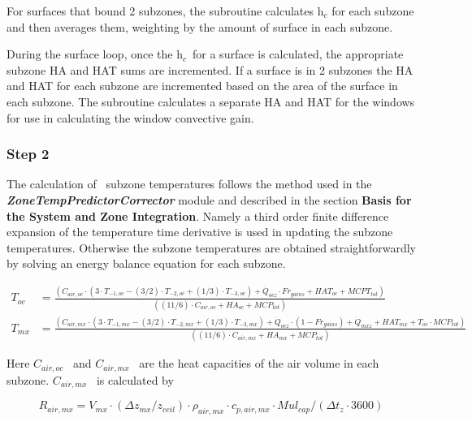 For surfaces that bound 2 subzones, the subroutine calculates h\(_{c}\) for each subzone and then averages them, weighting by the amount of surface in each subzone.

During the surface loop, once the h\(_{c}\)~for a surface is calculated, the appropriate subzone HA and HAT sums are incremented. If a surface is in 2 subzones the HA and HAT for each subzone are incremented based on the area of the surface in each subzone. The subroutine calculates a separate HA and HAT for the windows for use in calculating the window convective gain.

\subsubsection{Step 2}\label{step-2-1}

The calculation of~ subzone temperatures follows the method used in the \textbf{\emph{ZoneTempPredictorCorrector}} module and described in the section \textbf{Basis for the System and Zone Integration}. Namely a third order finite difference expansion of the temperature time derivative is used in updating the subzone temperatures. Otherwise the subzone temperatures are obtained straightforwardly by solving an energy balance equation for each subzone.

\begin{equation}
  \begin{array}{cl}
    T_{oc} & = \frac{(C_{air,oc} \cdot (3 \cdot T_{ - 1,oc} - (3/2) \cdot T_{ - 2,oc} + (1/3) \cdot T_{ - 3,oc}) + \dot Q_{ocz} \cdot Fr_{gains} + HAT_{oc} + MCPT_{tot})} {((11/6) \cdot C_{air,oc} + HA_{oc} + MCP_{tot})} \\
    T_{mx} & = \frac{(C_{air,mx} \cdot (3 \cdot T_{ - 1,mx} - (3/2) \cdot T_{ - 2,mx} + (1/3) \cdot T_{ - 3,mx}) + \dot Q_{ocz} \cdot (1 - Fr_{gains}) + \dot Q_{mxz} + HAT_{mx} + T_{oc} \cdot MCP_{tot})} {((11/6) \cdot C_{air,mx} + HA_{mx} + MCP_{tot})}
  \end{array}
\end{equation}

Here \({C_{air,oc}}\) ~and \({C_{air,mx}}\) ~are the heat capacities of the air volume in each subzone. \({C_{air,mx}}\) ~is calculated by

\begin{equation}
{R_{air,mx}} = {V_{mx}} \cdot \left( {\Delta {z_{mx}}/{z_{ceil}}} \right) \cdot {\rho_{air,mx}} \cdot {c_{p,air,mx}} \cdot Mu{l_{cap}}/\left( {\Delta {t_z} \cdot 3600} \right)
\end{equation}

